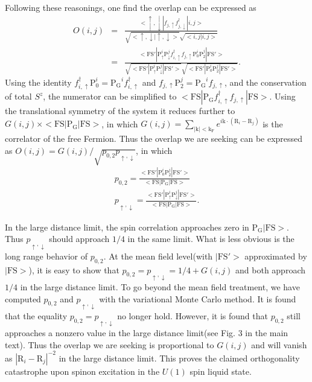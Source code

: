 \documentclass[12pt]{article}
\begin{document}
Following these reasonings, one find the overlap can be expressed as
\begin{eqnarray}
O(i,j)&=&\frac{<\uparrow,\downarrow|f_{j,\uparrow}f^{\dagger}_{j,\downarrow}|i,j>}{\sqrt{<\uparrow,\downarrow|\uparrow,\downarrow>}\sqrt{<i,j|i,j>}}\nonumber\\
&=&\frac{<\mathrm{FS'}| \mathrm{P}^{i}_{\uparrow}\mathrm{P}^{j}_{\downarrow}f^{\dagger}_{i,\uparrow}f_{j,\uparrow} \mathrm{P}^{i}_{0}\mathrm{P}^{j}_{2}|\mathrm{FS'}>}{\sqrt{<\mathrm{FS'}| \mathrm{P}^{i}_{\uparrow}\mathrm{P}^{j}_{\downarrow} |\mathrm{FS'}>}\sqrt{<\mathrm{FS'}| \mathrm{P}^{i}_{0}\mathrm{P}^{j}_{2} |\mathrm{FS'}>}}.\nonumber
\end{eqnarray}   
Using the identity $f^{\dagger}_{i,\uparrow}\mathrm{P}^{i}_{0}=\mathrm{P_{G}}^{i}f^{\dagger}_{i,\uparrow}$ and $f_{j,\uparrow}\mathrm{P}^{j}_{2}=\mathrm{P_{G}}^{i}f_{j,\uparrow}$, and the conservation of total $S^{z}$, the numerator can be simplified to $<\mathrm{FS}| \mathrm{P_{G}}f^{\dagger}_{i,\uparrow}f_{j,\uparrow} |\mathrm{FS}>$. Using the translational symmetry of the system it reduces further to $G(i,j)\times<\mathrm{FS}| \mathrm{P_{G}} |\mathrm{FS}>$, in which $G(i,j)=\sum_{\mathrm{|k|<k_{F}}}e^{i\mathrm{k}\cdot(\mathrm{R}_{i}-\mathrm{R}_{j})}$ is the correlator of the free Fermion. Thus the overlap we are seeking can be expressed as $O(i,j)=G(i,j)/\sqrt{p_{0,2}p_{\uparrow,\downarrow}}$, in which 
\begin{eqnarray}
p_{0,2}=\frac{<\mathrm{FS'}| \mathrm{P}^{i}_{0}\mathrm{P}^{j}_{2} |\mathrm{FS'}>}{<\mathrm{FS}| \mathrm{P_{G}}|\mathrm{FS}>}\nonumber\\
p_{\uparrow,\downarrow}=\frac{<\mathrm{FS'}| \mathrm{P}^{i}_{\uparrow}\mathrm{P}^{j}_{\downarrow} |\mathrm{FS'}>}{<\mathrm{FS}| \mathrm{P_{G}}|\mathrm{FS}>}.\nonumber
\end{eqnarray}

In the large distance limit, the spin correlation approaches zero in $\mathrm{P_{G}}|\mathrm{FS}>$. Thus $p_{\uparrow,\downarrow}$ should approach $1/4$ in the same limit. What is less obvious is the long range behavior of $p_{0,2}$. At the mean field level(with $|\mathrm{FS'}>$ approximated by $|\mathrm{FS}>$),  it is easy to show that $p_{0,2}=p_{\uparrow,\downarrow}=1/4+G(i,j)$
and both approach $1/4$ in the large distance limit. To go beyond the mean field treatment, we have computed $p_{0,2}$ and $p_{\uparrow,\downarrow}$ with the variational Monte Carlo method. It is found that the equality $p_{0,2}=p_{\uparrow,\downarrow}$ no longer hold. However, it is found that $p_{0,2}$ still approaches a nonzero value in the large distance limit(see Fig. 3 in the main text).  
Thus the overlap we are seeking is proportional to $G(i,j)$ and will vanish as $|\mathrm{R}_{i}-\mathrm{R}_{j}|^{-2}$ in the large distance limit. This proves the claimed orthogonality catastrophe upon spinon excitation in the $U(1)$ spin liquid state. 
\end{document}
